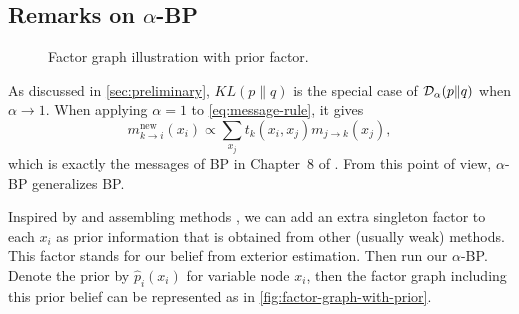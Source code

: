 \documentclass[conference]{IEEEtran}
\begin{document}
\subsection{Remarks on $\alpha$-BP}\label{subsec:remark}
\begin{figure}[!ht]
  \begin{centering}
    \caption{Factor graph illustration with prior factor.}\label{fig:factor-graph-with-prior}
    \vspace{0.1cm}
  \end{centering}
\end{figure}

As discussed in \autoref{sec:preliminary}, $KL(p\|q)$ is the special case of $\mathcal{D}_{\alpha}(p\|q)$ when $\alpha \rightarrow 1$. When applying $\alpha=1$ to \autoref{eq:message-rule}, it gives
\begin{equation}
  {m}^{\text{new}}_{k\rightarrow i}(x_i) \propto \sum_{x_j} t_k(x_i, x_j) m_{j \rightarrow k}(x_j),
\end{equation}
which is exactly the messages of BP in Chapter~$8$ of \cite{Bishop:2006:PRM:1162264}. From this point of view, $\alpha$-BP generalizes BP.

Inspired by \cite{pseudo_priorBP2010} and assembling methods \cite{James:2014:ISL:2517747}, we can add an extra singleton factor to each $x_i$ as prior information that is obtained from other (usually weak) methods. This factor stands for our belief from exterior estimation. Then run our $\alpha$-BP. Denote the prior by $\hat{p}_i(x_i)$ for variable node $x_i$, then the factor graph including this prior belief can be represented as in \autoref{fig:factor-graph-with-prior}.
\end{document}
